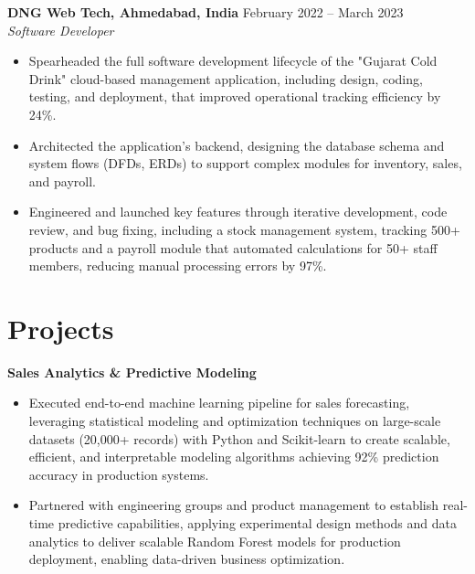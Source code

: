\documentclass[a4paper,10pt]{article}
\begin{document}
\textbf{DNG Web Tech, Ahmedabad, India} \hfill February 2022 -- March 2023 \\
\textit{Software Developer} \\

\begin{itemize}[leftmargin=*, itemsep=0pt, parsep=1pt] %
\vspace{-7mm}
    \item Spearheaded the full software development lifecycle of the "Gujarat Cold Drink" cloud-based management application, including design, coding, testing, and deployment, that improved operational tracking efficiency by 24\%.
\item Architected the application's backend, designing the database schema and system flows (DFDs, ERDs) to support complex modules for inventory, sales, and payroll.
\item Engineered and launched key features through iterative development, code review, and bug fixing, including a stock management system, tracking 500+ products and a payroll module that automated calculations for 50+ staff members, reducing manual processing errors by 97\%. 

\end{itemize}

\vspace{-4mm}

\section*{Projects}
\textbf{Sales Analytics \& Predictive Modeling} \\
\begin{itemize}[leftmargin=*, itemsep=0pt, parsep=1pt]
\vspace{-7mm}
    \item Executed end-to-end machine learning pipeline for sales forecasting, leveraging statistical modeling and optimization techniques on large-scale datasets (20,000+ records) with Python and Scikit-learn to create scalable, efficient, and interpretable modeling algorithms achieving 92\% prediction accuracy in production systems.
    \item Partnered with engineering groups and product management to establish real-time predictive capabilities, applying experimental design methods and data analytics to deliver scalable Random Forest models for production deployment, enabling data-driven business optimization.
    \end{itemize}
\end{document}
